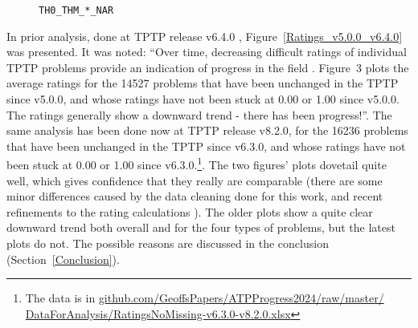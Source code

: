 \documentclass[runningheads]{llncs}
\begin{document}
\begin{figure}[h!]
\begin{minipage}[t]{.49\textwidth}
  \vspace*{-2em}
  \caption{{\tt TH0\_THM\_*\_NAR}}
  \label{Plot_TH0_THM_NAR}
\end{minipage}
\end{figure}

In prior analysis, done at TPTP release v6.4.0 \cite{Sut17}, Figure~\ref{Ratings_v5.0.0_v6.4.0} 
was presented. 
It was noted: ``Over time, decreasing difficult ratings of individual TPTP problems provide an 
indication of progress in the field \cite{SFS01}. Figure~3 plots the average ratings for the 
14527 problems that have been unchanged in the TPTP since v5.0.0, and whose ratings have not 
been stuck at 0.00 or 1.00 since v5.0.0. The ratings generally show a downward trend - there 
has been progress!''.
The same analysis has been done now at TPTP release v8.2.0, for the 16236 problems that have been 
unchanged in the TPTP since v6.3.0, and whose ratings have not been stuck at 0.00 or 1.00 since 
v6.3.0.\footnote{%
The data is in \href{https://github.com/GeoffsPapers/ATPProgress2024/raw/master/DataForAnalysis/RatingsNoMissing-v6.3.0-v8.2.0.xlsx}{github.com/GeoffsPapers/ATPProgress2024/raw/master/} 
\href{https://github.com/GeoffsPapers/ATPProgress2024/raw/master/DataForAnalysis/RatingsNoMissing-v6.3.0-v8.2.0.xlsx}{DataForAnalysis/RatingsNoMissing-v6.3.0-v8.2.0.xlsx}}.
The two figures' plots dovetail quite well, which gives confidence that they really are comparable
(there are some minor differences caused by the data cleaning done for this work, and recent 
refinements to the rating calculations \cite{SD23-CASC,SD24-CASC}).
The older plots show a quite clear downward trend both overall and for the four types of problems,
but the latest plots do not.
The possible reasons are discussed in the conclusion (Section~\ref{Conclusion}).
\end{document}

